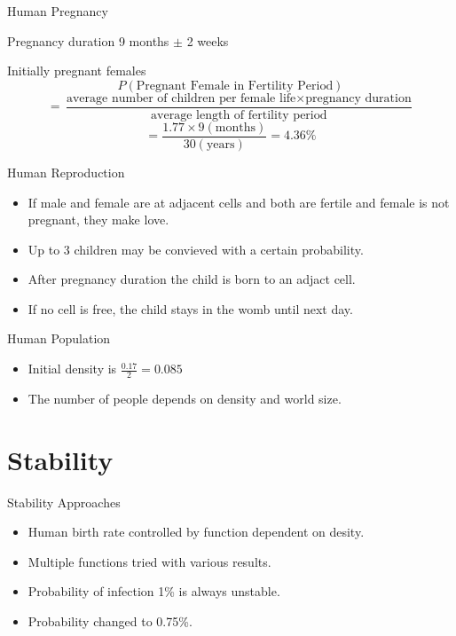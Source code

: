 \documentclass{beamer}
\begin{document}
\begin{frame}{Human Pregnancy}
    \begin{block}{Pregnancy duration}
        9 months $\pm$ 2 weeks
    \end{block}
    \begin{block}{Initially pregnant females}
        $$ P(\text{Pregnant Female in Fertility Period}) $$
        $$ = \frac{\text{average number of children per female life} \times \text{pregnancy duration}}{\text{average length of fertility period}} $$
        $$ = \frac{1.77 \times 9 (\text{months})}{30 (\text{years})} = 4.36\% $$
    \end{block}
\end{frame}

\begin{frame}{Human Reproduction}
    \begin{itemize}
        \item If male and female are at adjacent cells and both are fertile and female is not pregnant, they make love.
        \item Up to 3 children may be convieved with a certain probability.
        \item After pregnancy duration the child is born to an adjact cell.
        \item If no cell is free, the child stays in the womb until next day. 
    \end{itemize}
\end{frame}

\begin{frame}{Human Population}
    \begin{itemize}
        \item Initial density is $ \frac{0.17}{2} = 0.085 $
        \item The number of people depends on density and world size.
    \end{itemize}
\end{frame}

\section{Stability}

\begin{frame}{Stability Approaches}
    \begin{itemize}
        \item Human birth rate controlled by function dependent on desity.
        \item Multiple functions tried with various results.
        \item Probability of infection 1\% is always unstable.
        \item Probability changed to 0.75\%.
    \end{itemize}
\end{frame}
\end{document}
